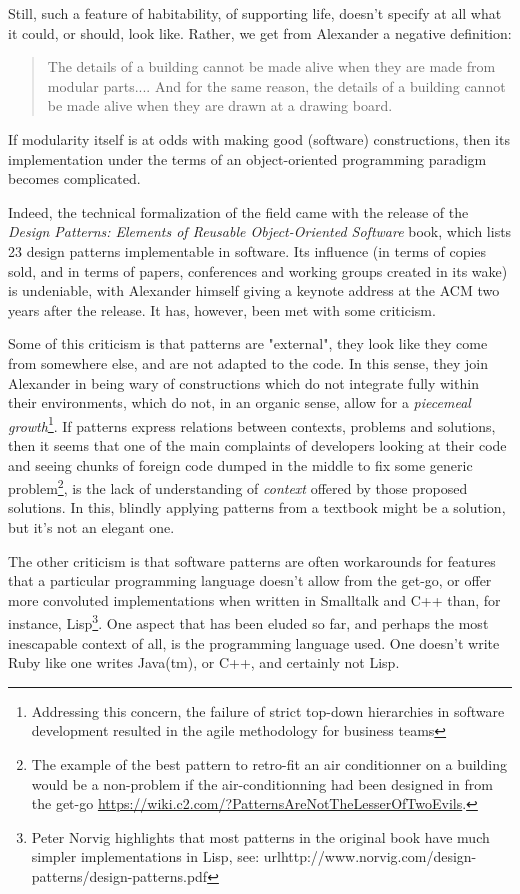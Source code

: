 \documentclass{article}
\begin{document}
Still, such a feature of habitability, of supporting life, doesn't specify at all what it could, or should, look like. Rather, we get from Alexander a negative definition:

\begin{quote}
  The details of a building cannot be made alive when they are made from modular parts.... And for the same reason, the details of a building cannot be made alive when they are drawn at a drawing board.\cite{alexander_timeless_1979}
\end{quote}

If modularity itself is at odds with making good (software) constructions, then its implementation under the terms of an object-oriented programming paradigm becomes complicated.

Indeed, the technical formalization of the field came with the release of the \emph{Design Patterns: Elements of Reusable Object-Oriented Software} book, which lists 23 design patterns implementable in software\cite{gamma_design_1994}. Its influence (in terms of copies sold, and in terms of papers, conferences and working groups created in its wake) is undeniable, with Alexander himself giving a keynote address at the ACM two years after the release. It has, however, been met with some criticism.

Some of this criticism is that patterns are "external", they look like they come from somewhere else, and are not adapted to the code. In this sense, they join Alexander in being wary of constructions which do not integrate fully within their environments, which do not, in an organic sense, allow for a \emph{piecemeal growth}\footnote{Addressing this concern, the failure of strict top-down hierarchies in software development resulted in the agile methodology for business teams}. If patterns express relations between contexts, problems and solutions, then it seems that one of the main complaints of developers looking at their code and seeing chunks of foreign code dumped in the middle to fix some generic problem\footnote{The example of the best pattern to retro-fit an air conditionner on a building would be a non-problem if the air-conditionning had been designed in from the get-go \url{https://wiki.c2.com/?PatternsAreNotTheLesserOfTwoEvils}.}, is the lack of understanding of \emph{context} offered by those proposed solutions. In this, blindly applying patterns from a textbook might be a solution, but it's not an elegant one.

The other criticism is that software patterns are often workarounds for features that a particular programming language doesn't allow from the get-go, or offer more convoluted implementations when written in Smalltalk and C++ than, for instance, Lisp\footnote{Peter Norvig highlights that most patterns in the original book have much simpler implementations in Lisp, see: url{http://www.norvig.com/design-patterns/design-patterns.pdf}}. One aspect that has been eluded so far, and perhaps the most inescapable context of all, is the programming language used. One doesn't write Ruby like one writes Java(tm), or C++, and certainly not Lisp.
\end{document}

